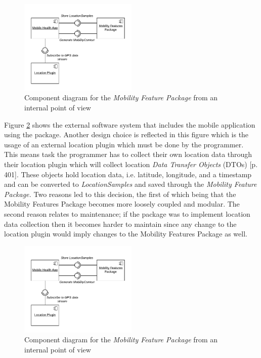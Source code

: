 \begin{figure}[h]
\centering
\includegraphics[width=0.5\textwidth]{images/diagrams/component-external.pdf}
\caption{Component diagram for the \textit{Mobility Feature Package} from an internal point of view}
\label{fig:component-diagram-internal}
\end{figure}

Figure \ref{fig:component-diagram-external} shows the external software system that includes the mobile application using the package. Another design choice is reflected in this figure which is the usage of an external location plugin which must be done by the programmer. This means task the programmer has to collect their own location data through their location plugin which will collect location \textit{Data Transfer Objects} (DTOs) \cite{fowler-PEEA} [p. 401]. These objects hold location data, i.e. latitude, longitude, and a timestamp and can be converted to \textit{LocationSamples} and saved through the \textit{Mobility Feature Package.}
Two reasons led to this decision, the first of which being that the Mobility Features Package becomes more loosely coupled and modular. The second reason relates to maintenance; if the package was to implement location data collection then it becomes harder to maintain since any change to the location plugin would imply changes to the Mobility Features Package as well. 

\begin{figure}[h]
\centering
\includegraphics[width=0.5\textwidth]{images/diagrams/component-external.pdf}
\caption{Component diagram for the \textit{Mobility Feature Package} from an internal point of view}
\label{fig:component-diagram-external}
\end{figure}


